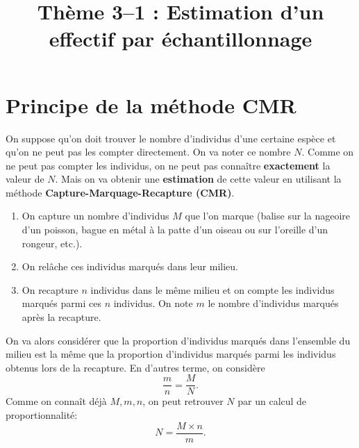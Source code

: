 \documentclass[11pt]{article}
\title{Thème 3--1 : Estimation d'un effectif par échantillonnage}
\date{}
\author{}
\begin{document}
\maketitle\thispagestyle{fancy}

\section{Principe de la méthode CMR}

On suppose qu'on doit trouver le nombre d'individus d'une certaine espèce et
qu'on ne peut pas les compter directement. On va noter ce nombre $N$. Comme on
ne peut pas compter les individus, on ne peut pas connaître \textbf{exactement} la
valeur de $N$. Mais on va obtenir une \textbf{estimation} de cette valeur en
utilisant la méthode \textbf{Capture-Marquage-Recapture (CMR)}.
\begin{enumerate}
  \item On capture un nombre d'individus $M$ que l'on marque (balise sur la
    nageoire d'un poisson, bague en métal à la patte d'un oiseau ou sur
    l'oreille d'un rongeur, etc.).
  \item On rel\^ache ces individus marqués dans leur milieu.
  \item On recapture $n$ individus dans le même milieu et on compte les
    individus marqués parmi ces $n$ individus. On note $m$ le nombre d'individus
    marqués après la recapture.
\end{enumerate}
On va alors considérer que la proportion d'individus marqués dans l'ensemble du
milieu est la même que la proportion d'individus marqués parmi les individus
obtenus lors de la recapture. En d'autres terme, on considère
\[
  \frac{m}{n} = \frac{M}{N}.
\]
Comme on connaît déjà $M, m, n$, on peut retrouver $N$ par un calcul de
proportionnalité:
\[
  N = \frac{M\times n}{m}.
\]
\end{document}
